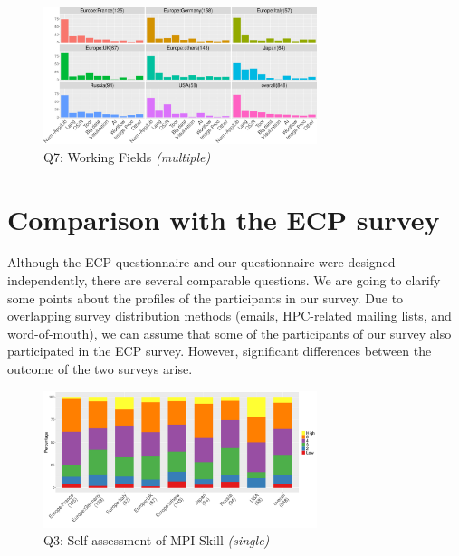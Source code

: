 \documentclass[preprint,5p,times]{elsarticle}
\begin{document}
\begin{figure}[tb]
  \begin{center}
    \includegraphics[width=8.0cm]{R-scripts/Q7.pdf}
    \vspace{-1.5mm}
    \caption{Q7: Working Fields {\it(multiple)}}
    \label{fig:working-fields}
\vspace{-3mm}%
  \end{center}
\end{figure}

\section{Comparison with the ECP survey}\label{sec:ecp}

Although the ECP questionnaire and our questionnaire were designed
independently, there are several comparable
questions. We are
  going to clarify some points about the profiles of the participants
in our survey.
%
Due to overlapping survey distribution methods (emails, HPC-related mailing lists, and word-of-mouth), we can assume
that some of the participants of our survey also participated in the ECP survey.
However, significant differences between the outcome of the two surveys arise.

\begin{figure}[tb]
  \begin{center}
    \includegraphics[width=8.0cm]{R-scripts/Q3.pdf}
    \vspace{-1.5mm}
    \caption{Q3: Self assessment of MPI Skill {\it(single)}}
    \label{fig:mpi-skill}
\vspace{-3mm}%
  \end{center}
\end{figure}
\end{document}
